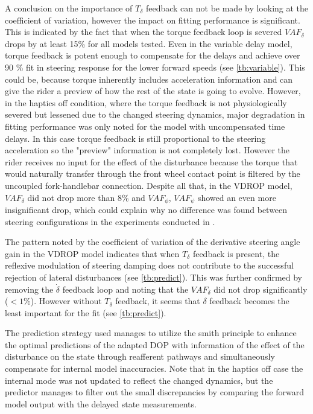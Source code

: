 A conclusion on the importance of \ensuremath{T_\delta} feedback can not be made by looking at the coefficient of variation, however the impact on fitting performance is significant. This is  indicated  by the fact that when the torque feedback loop is severed \ensuremath{\mathit{VAF}_\delta} drops by at least 15\% for all models tested. Even in the variable delay model, torque feedback is potent enough to compensate for the delays and achieve over 90 \% fit in steering response for the lower forward speeds (see \cref{tb:variable}). This could be, because torque inherently includes acceleration information and can give  the rider a preview of how the rest of the state is going to evolve. However, in the haptics off condition, where the torque feedback is not physiologically severed but lessened due to the changed steering dynamics,  major  degradation in fitting performance was only noted for the model with uncompensated time delays. In this case torque feedback is still proportional to the steering acceleration so the "preview" information is not completely lost. However the rider receives no input for the effect of the disturbance because the torque that would naturally transfer through the front wheel contact point is filtered by the uncoupled fork-handlebar connection.  Despite all that, in the VDROP model, \ensuremath{VAF_\delta} did not drop more than 8\% and \ensuremath{VAF_\phi}, \ensuremath{VAF_\psi} showed an even more insignificant drop, which could explain why no difference was found between steering configurations in the experiments conducted in \cite{dialynaseffect}. 

The pattern noted by the coefficient of variation of the derivative steering angle gain in the VDROP model indicates that when  \ensuremath{T_\delta} feedback  is present, the reflexive modulation of steering damping does not contribute to the successful rejection of lateral disturbances (see \cref{tb:predict}).  This was further confirmed by removing the \ensuremath{\dot{\delta}} feedback loop and noting that the \ensuremath{\mathit{VAF}_\delta} did not drop significantly (\ensuremath{< 1\%}). However without \ensuremath{T_\delta} feedback,  it seems that \ensuremath{{\delta}} feedback becomes the least important for the fit (see \cref{tb:predict}). 

The  prediction strategy used  manages to utilize the smith  principle to enhance the optimal  predictions of the adapted DOP with  information of the effect of the disturbance on the state through reafferent pathways and simultaneously compensate for internal model inaccuracies. Note that in the haptics off case the internal mode was not updated to reflect the changed dynamics, but the predictor manages to filter out the small discrepancies by comparing the forward model output with the delayed state measurements. 

